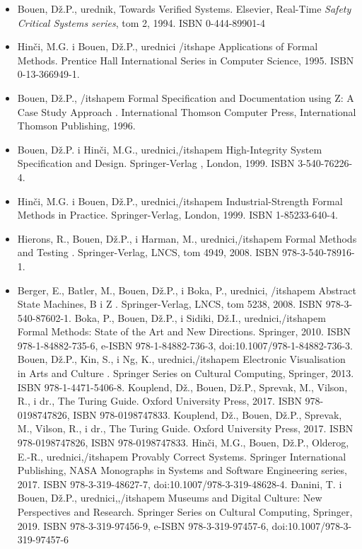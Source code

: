 \documentclass[a4paper]{article}
\begin{document}
\begin{itemize}
\item Bouen, Dž.P., urednik, Towards Verified Systems. Elsevier, Real-Time {\itshape Safety Critical Systems series}, tom 2, 1994. ISBN 0-444-89901-4
\item Hinči, M.G. i Bouen, Dž.P., urednici {/itshape Applications of Formal Methods}. Prentice Hall International Series in Computer Science, 1995. ISBN 0-13-366949-1.
\item Bouen, Dž.P., {/itshapem Formal Specification and Documentation using Z: A Case Study Approach }. International Thomson Computer Press, International Thomson Publishing, 1996. 
\item Bouen, Dž.P. i Hinči, M.G., urednici,{/itshapem High-Integrity System Specification and Design. }Springer-Verlag , London, 1999. ISBN 3-540-76226-4.
\item Hinči, M.G. i Bouen, Dž.P., urednici,{/itshapem Industrial-Strength Formal Methods in Practice. } Springer-Verlag, London, 1999. ISBN 1-85233-640-4.
\item Hierons, R., Bouen, Dž.P., i Harman, M., urednici,{/itshapem  Formal Methods and Testing} . Springer-Verlag, LNCS, tom 4949, 2008. ISBN 978-3-540-78916-1.
\item Berger, E., Batler, M., Bouen, Dž.P., i Boka, P., urednici, {/itshapem Abstract State Machines, B i Z }. Springer-Verlag, LNCS, tom 5238, 2008. ISBN 978-3-540-87602-1.
\itemem Boka, P., Bouen, Dž.P., i Sidiki, Dž.I., urednici,{/itshapem Formal Methods: State of the Art and New Directions}. Springer, 2010. ISBN 978-1-84882-735-6, e-ISBN 978-1-84882-736-3, doi:10.1007/978-1-84882-736-3.
\itemem Bouen, Dž.P., Kin, S., i Ng, K., urednici,{/itshapem Electronic Visualisation in Arts and Culture} . Springer Series on Cultural Computing, Springer, 2013. ISBN 978-1-4471-5406-8.
\itemem Kouplend, Dž., Bouen, Dž.P., Sprevak, M., Vilson, R., i dr., The Turing Guide. Oxford University Press, 2017. ISBN 978-0198747826, ISBN 978-0198747833.
\itemem Kouplend, Dž., Bouen, Dž.P., Sprevak, M., Vilson, R., i dr., The Turing Guide. Oxford University Press, 2017. ISBN 978-0198747826, ISBN 978-0198747833.
\itemem Hinči, M.G., Bouen, Dž.P., Olderog, E.-R., urednici,{/itshapem Provably Correct Systems}. Springer International Publishing, NASA Monographs in Systems and Software Engineering series, 2017. ISBN 978-3-319-48627-7, doi:10.1007/978-3-319-48628-4.
\itemem Đanini, T. i Bouen, Dž.P., urednici,,{/itshapem Museums and Digital Culture: New Perspectives and Research}. Springer Series on Cultural Computing, Springer, 2019. ISBN 978-3-319-97456-9, e-ISBN 978-3-319-97457-6, doi:10.1007/978-3-319-97457-6
\end{itemize}
\end{document}
